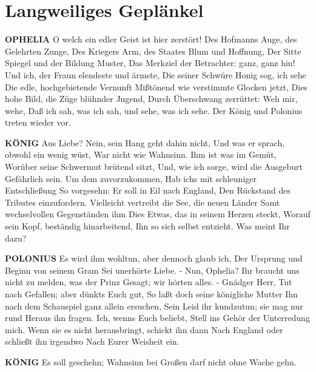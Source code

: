 \chapter{Langweiliges Geplänkel}

\textbf{OPHELIA}
O welch ein edler Geist ist hier zerstört!
Des Hofmanns Auge, des Gelehrten Zunge,
Des Kriegers Arm, des Staates Blum und Hoffnung,
Der Sitte Spiegel und der Bildung Muster,
Das Merkziel der Betrachter: ganz, ganz hin!
Und ich, der Fraun elendeste und ärmste,
Die seiner Schwüre Honig sog, ich sehe
Die edle, hochgebietende Vernunft
Mißtönend wie verstimmte Glocken jetzt,
Dies hohe Bild, die Züge blühnder Jugend,
Durch Überschwang zerrüttet: Weh mir, wehe,
Daß ich sah, was ich sah, und sehe, was ich sehe.
Der König und Polonius treten wieder vor.

\textbf{KÖNIG}
Aus Liebe? Nein, sein Hang geht dahin nicht,
Und was er sprach, obwohl ein wenig wüst,
War nicht wie Wahnsinn. Ihm ist was im Gemüt,
Worüber seine Schwermut brütend sitzt,
Und, wie ich sorge, wird die Ausgeburt
Gefährlich sein. Um dem zuvorzukommen,
Hab ichs mit schleuniger Entschließung
So vorgesehn: Er soll in Eil nach England,
Den Rückstand des Tributes einzufordern.
Vielleicht vertreibt die See, die neuen Länder
Samt wechselvollen Gegenständen ihm
Dies Etwas, das in seinem Herzen steckt,
Worauf sein Kopf, beständig hinarbeitend,
Ihn so sich selbst entzieht. Was meint Ihr dazu?

\textbf{POLONIUS}
Es wird ihm wohltun, aber dennoch glaub ich,
Der Ursprung und Beginn von seinem Gram
Sei unerhörte Liebe. - Nun, Ophelia?
Ihr braucht uns nicht zu melden, was der Prinz
Gesagt; wir hörten alles. - Gnädger Herr,
Tut nach Gefallen; aber dünkts Euch gut,
So laßt doch seine königliche Mutter
Ihn nach dem Schauspiel ganz allein ersuchen,
Sein Leid ihr kundzutun; sie mag nur rund
Heraus ihn fragen. Ich, wenns Euch beliebt,
Stell ins Gehör der Unterredung mich.
Wenn sie es nicht herausbringt, schickt ihn dann
Nach England oder schließt ihn irgendwo
Nach Eurer Weisheit ein.

\textbf{KÖNIG}
Es soll geschehn;
Wahnsinn bei Großen darf nicht ohne Wache gehn.

